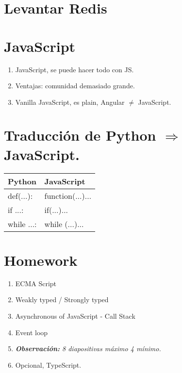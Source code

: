 \section{Levantar Redis}

\section{JavaScript}
\begin{enumerate}
    \item JavaScript, se puede hacer todo con JS.
    \item Ventajas: comunidad demasiado grande.
    \item Vanilla JavaScript, es plain, Angular $\neq$ JavaScript. 
\end{enumerate}
\section{Traducción de Python $\Rightarrow$ JavaScript.}
\begin{center}
\begin{tabular}{ | p{5cm} | p{5cm} | }
 \hline
Python & JavaScript \\
 \hline
def(...): & function(...){...}\\ 
if ...: & if(...){...}\\ 
while ...: & while (...){...}\\ 

\end{tabular}
\end{center}

\section{Homework}
\begin{enumerate}
    \item ECMA Script 
    \item Weakly typed / Strongly typed
    \item Asynchronous of JavaScript - Call Stack
    \item Event loop 
    \item \emph{\textbf{Observación: }8 diapositivas máximo 4 mínimo.}
    \item Opcional, TypeScript.
\end{enumerate}

